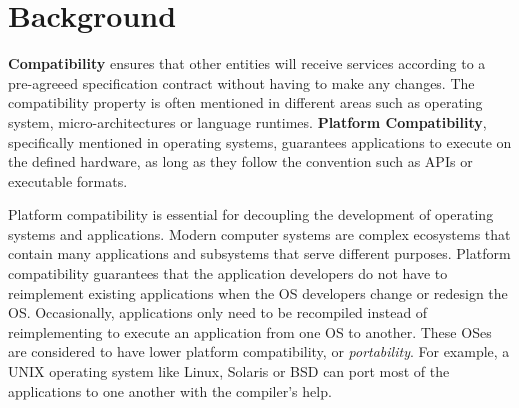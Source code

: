 \section{Background}
\label{sec:background}



{\bf Compatibility} ensures that other entities will receive services according to a pre-agreeed specification contract without having to make any changes.
The compatibility property is often mentioned in different areas such as operating system, micro-architectures or language runtimes.
{\bf Platform Compatibility}, specifically mentioned in operating systems, guarantees applications to execute on the defined hardware,
as long as they follow the convention such as APIs or executable formats.


Platform compatibility is essential for decoupling the development of operating systems and applications.
Modern computer systems are complex ecosystems that contain 
many
applications and subsystems 
that serve different
purposes.
Platform compatibility guarantees that the application developers do not have to 
reimplement existing applications when the OS developers change or redesign the OS.
Occasionally, applications only need to be recompiled instead of reimplementing to execute an application from one OS to another. 
These OSes are considered to have lower platform compatibility, or {\em portability}.
For example, a UNIX operating system like Linux, Solaris or BSD can port most of the applications to one another with the compiler's help.

